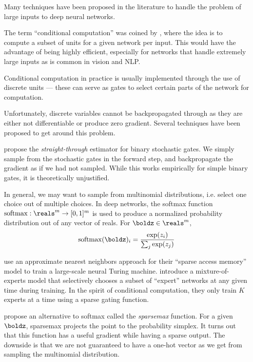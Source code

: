 \documentclass[12pt]{report}
\begin{document}
Many techniques have been proposed in the literature to handle the problem of large inputs to deep neural networks.

The term ``conditional computation'' was coined by \citet{BengioLC13}, where the idea is to compute a subset of units for a given network per input. This would have the advantage of being highly efficient, especially for networks that handle extremely large inputs as is common in vision and NLP.


Conditional computation in practice is usually implemented through the use of discrete units --- these can serve as gates to select certain parts of the network for computation.


Unfortunately, discrete variables cannot be backpropagated through as they are either not differentiable or produce zero gradient. Several techniques have been proposed to get around this problem.

\citet{BengioLC13} propose the \emph{straight-through} estimator for binary stochastic gates. We simply sample from the stochastic gates in the forward step, and backpropagate the gradient as if we had not sampled. While this works empirically for simple binary gates, it is theoretically unjustified.


In general, we may want to sample from multinomial distributions, i.e. select one choice out of multiple choices. In deep networks, the softmax function $\operatorname{softmax} : \reals^m \to [0,1]^m$ is used to produce a normalized probability distribution out of any vector of reals. For $\boldz \in \reals^m$,
\begin{equation}
\operatorname{softmax}(\boldz)_i = \frac{\exp(z_i)}{\sum_j \exp(z_j)}
\end{equation}

\citet{rae2016sparsememory} use an approximate nearest neighbors approach for their ``sparse access memory'' model to train a large-scale neural Turing machine. \citet{Shazeer2017} introduce a mixture-of-experts model that selectively chooses a subset of ``expert'' networks at any given time during training. In the spirit of conditional computation, they only train $K$ experts at a time using a sparse gating function.

\citet{martins2016sparsemax} propose an alternative to softmax called the \emph{sparsemax} function. For a given $\boldz$, sparsemax projects the point to the probability simplex. It turns out that this function has a useful gradient while having a sparse output. The downside is that we are not guaranteed to have a one-hot vector as we get from sampling the multinomial distribution.
\end{document}
